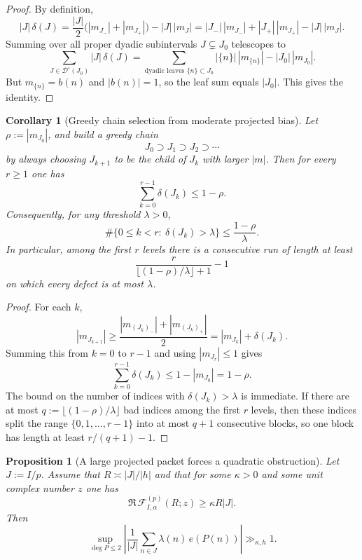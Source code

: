 \documentclass[11pt]{scrartcl}
\numberwithin{equation}{section}
\newtheorem{proposition}[theorem]{Proposition}
\newtheorem{corollary}[theorem]{Corollary}
\theoremstyle{definition}
\newcommand{\1}{\mathbf 1}
\newcommand{\ee}[1]{e\!\left(#1\right)}
\begin{document}
\begin{proof}
By definition,
\[
|J|\,\delta(J)
=
\frac{|J|}{2}\bigl(|m_{J_-}|+|m_{J_+}|\bigr)-|J|\,|m_J|
=
|J_-|\,|m_{J_-}|+|J_+|\,|m_{J_+}|-|J|\,|m_J|.
\]
Summing over all proper dyadic subintervals $J\subsetneq J_0$ telescopes to
\[
\sum_{J\in\mathcal D^\circ(J_0)} |J|\,\delta(J)
=
\sum_{\text{dyadic leaves }\{n\}\subset J_0} |\{n\}|\,|m_{\{n\}}|-|J_0|\,|m_{J_0}|.
\]
But $m_{\{n\}}=b(n)$ and $|b(n)|=1$, so the leaf sum equals $|J_0|$. This gives the identity.
\end{proof}

\begin{corollary}[Greedy chain selection from moderate projected bias]
\label{cor:projected-greedy-chain}
Let $\rho:=|m_{J_0}|$, and build a greedy chain
\[
J_0\supset J_1\supset J_2\supset \cdots
\]
by always choosing $J_{k+1}$ to be the child of $J_k$ with larger $|m|$. Then for every $r\ge 1$ one has
\[
\sum_{k=0}^{r-1}\delta(J_k)\le 1-\rho.
\]
Consequently, for any threshold $\lambda>0$,
\[
\#\{0\le k<r:\ \delta(J_k)>\lambda\}
\le \frac{1-\rho}{\lambda}.
\]
In particular, among the first $r$ levels there is a consecutive run of length at least
\[
\frac{r}{\lfloor (1-\rho)/\lambda\rfloor+1}-1
\]
on which every defect is at most $\lambda$.
\end{corollary}

\begin{proof}
For each $k$,
\[
|m_{J_{k+1}}|
\ge \frac{|m_{(J_k)_-}|+|m_{(J_k)_+}|}{2}
= |m_{J_k}|+\delta(J_k).
\]
Summing this from $k=0$ to $r-1$ and using $|m_{J_r}|\le 1$ gives
\[
\sum_{k=0}^{r-1}\delta(J_k)
\le 1-|m_{J_0}|=1-\rho.
\]
The bound on the number of indices with $\delta(J_k)>\lambda$ is immediate. If there are at most $q:=\lfloor (1-\rho)/\lambda\rfloor$ bad indices among the first $r$ levels, then these indices split the range $\{0,1,\dots,r-1\}$ into at most $q+1$ consecutive blocks, so one block has length at least $r/(q+1)-1$.
\end{proof}

\begin{proposition}[A large projected packet forces a quadratic obstruction]
\label{prop:projected-packet-quadratic}
Let $J:=I/p$. Assume that $R\asymp |J|/|h|$ and that for some $\kappa>0$ and some unit complex number $z$ one has
\[
\Re\,\mathcal F^{(p)}_{I,\alpha}(R;z)\ge \kappa R|J|.
\]
Then
\[
\sup_{\deg P\le 2}
\left|\frac{1}{|J|}\sum_{n\in J}\lambda(n)\,\ee{P(n)}\right|
\gg_{\kappa,h}1.
\]
\end{proposition}
\end{document}
